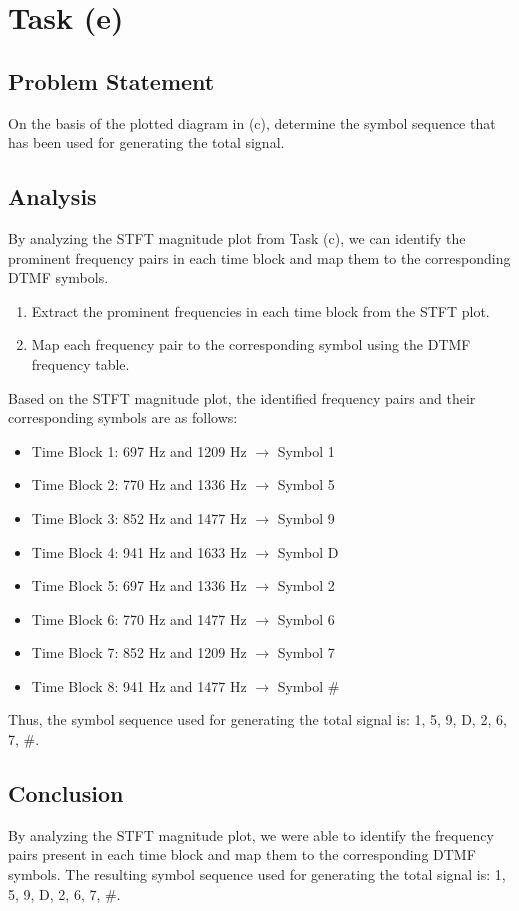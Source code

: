 \item[(e)]
\section*{Task (e)}

\subsection*{Problem Statement}
On the basis of the plotted diagram in (c), determine the symbol sequence that has been used for generating the total signal.

\subsection*{Analysis}
By analyzing the STFT magnitude plot from Task (c), we can identify the prominent frequency pairs in each time block and map them to the corresponding DTMF symbols.

\begin{enumerate}
    \item Extract the prominent frequencies in each time block from the STFT plot.
    \item Map each frequency pair to the corresponding symbol using the DTMF frequency table.
\end{enumerate}

Based on the STFT magnitude plot, the identified frequency pairs and their corresponding symbols are as follows:

\begin{itemize}
    \item Time Block 1: 697 Hz and 1209 Hz $\rightarrow$ Symbol 1
    \item Time Block 2: 770 Hz and 1336 Hz $\rightarrow$ Symbol 5
    \item Time Block 3: 852 Hz and 1477 Hz $\rightarrow$ Symbol 9
    \item Time Block 4: 941 Hz and 1633 Hz $\rightarrow$ Symbol D
    \item Time Block 5: 697 Hz and 1336 Hz $\rightarrow$ Symbol 2
    \item Time Block 6: 770 Hz and 1477 Hz $\rightarrow$ Symbol 6
    \item Time Block 7: 852 Hz and 1209 Hz $\rightarrow$ Symbol 7
    \item Time Block 8: 941 Hz and 1477 Hz $\rightarrow$ Symbol #
\end{itemize}

Thus, the symbol sequence used for generating the total signal is: 1, 5, 9, D, 2, 6, 7, #.

\subsection*{Conclusion}
By analyzing the STFT magnitude plot, we were able to identify the frequency pairs present in each time block and map them to the corresponding DTMF symbols. The resulting symbol sequence used for generating the total signal is: 1, 5, 9, D, 2, 6, 7, #.
